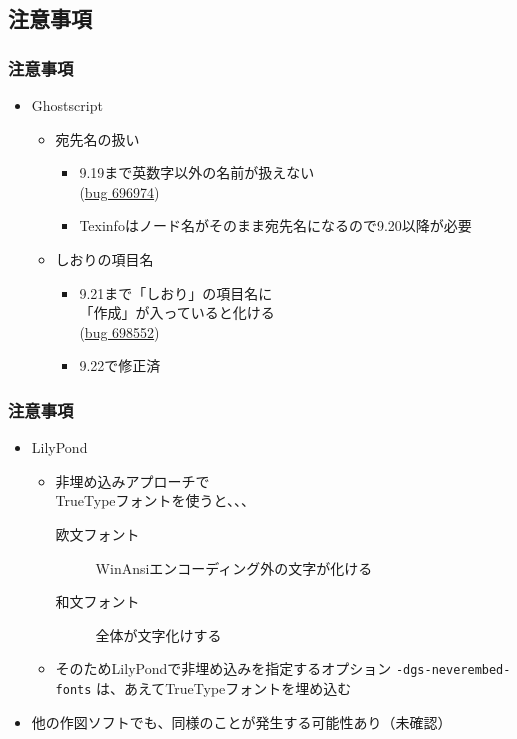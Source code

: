 \documentclass[unicode,17pt]{beamer}
\begin{document}
\subsection{注意事項}
\begin{frame}\frametitle{注意事項}
  \begin{itemize}
  \item Ghostscript
    \begin{itemize}
    \item 宛先名の扱い
      \begin{itemize}
      \item 9.19まで英数字以外の名前が扱えない\\
        (\href{https://bugs.ghostscript.com/show_bug.cgi?id=696974}%
        {bug 696974})
      \item Texinfoはノード名がそのまま宛先名になるので9.20以降が必要
      \end{itemize}
    \item しおりの項目名
      \begin{itemize}
      \item 9.21まで「しおり」の項目名に\\
        「作成」が入っていると化ける\\
        (\href{https://bugs.ghostscript.com/show_bug.cgi?id=698552}%
        {bug 698552})
      \item 9.22で修正済
      \end{itemize}
    \end{itemize}
  \end{itemize}
\end{frame}

\begin{frame}[fragile]\frametitle{注意事項}
  \begin{itemize}
  \item LilyPond
    \begin{itemize}
    \item 非埋め込みアプローチで\\
      TrueTypeフォントを使うと、、、
      \begin{description}
      \item[欧文フォント] WinAnsiエンコーディング外の文字が化ける
      \item[和文フォント] 全体が文字化けする
      \end{description}
    \item そのためLilyPondで非埋め込みを指定するオプション
      \verb|-dgs-neverembed-fonts|
      は、あえてTrueTypeフォントを埋め込む
    \end{itemize}
  \item 他の作図ソフトでも、同様のことが発生する可能性あり（未確認）
  \end{itemize}
\end{frame}
\end{document}
